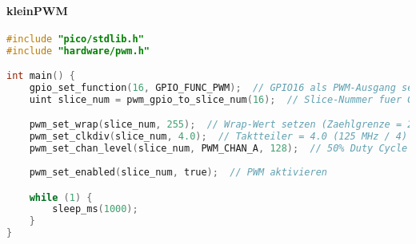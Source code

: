 \documentclass[a4paper,12pt,twoside]{article}
\begin{document}
	\paragraph{kleinPWM}
\begin{center}
	\begin{minipage}{1.0\textwidth}
		\begin{lstlisting}[language=C]
#include "pico/stdlib.h"
#include "hardware/pwm.h"

int main() {
    gpio_set_function(16, GPIO_FUNC_PWM);  // GPIO16 als PWM-Ausgang setzen
    uint slice_num = pwm_gpio_to_slice_num(16);  // Slice-Nummer fuer GPIO16 holen

    pwm_set_wrap(slice_num, 255);  // Wrap-Wert setzen (Zaehlgrenze = 255)
    pwm_set_clkdiv(slice_num, 4.0);  // Taktteiler = 4.0 (125 MHz / 4)
    pwm_set_chan_level(slice_num, PWM_CHAN_A, 128);  // 50% Duty Cycle (128 / 255)
    
    pwm_set_enabled(slice_num, true);  // PWM aktivieren

    while (1) {
        sleep_ms(1000);
    }
}

    \end{lstlisting}
	\end{minipage}
\end{center}
\end{document}

